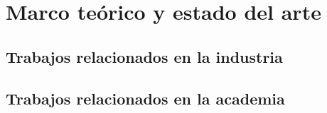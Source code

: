 \chapter{Marco teórico y estado del arte}
\label{chapter:state-of-art}

\section{Trabajos relacionados en la industria}
\label{section:relaccionados-industria}

\section{Trabajos relacionados en la academia}
\label{section:relacionados-academia}
